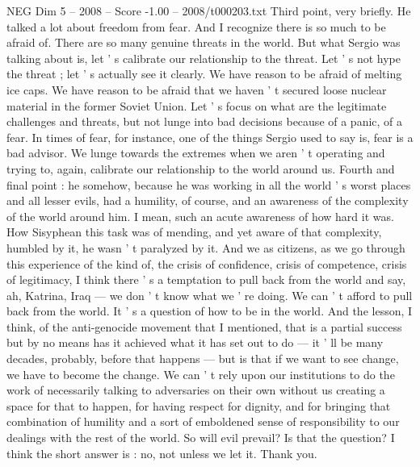 \begin{textsample}{NEG Dim 5 – 2008 – Score -1.00 – 2008/t000203.txt}
Third point, very briefly.
He talked a lot about freedom from fear.
And I recognize there is so much to be afraid of.
There are so many genuine threats in the world.
But what Sergio was talking about is, let ' s calibrate our relationship to the threat.
Let ' s not hype the threat ; let ' s actually see it clearly.
We have reason to be afraid of melting ice caps.
We have reason to be afraid that we haven ' t secured loose nuclear material in the former Soviet Union.
Let ' s focus on what are the legitimate challenges and threats, but not lunge into bad decisions because of a panic, of a fear.
In times of fear, for instance, one of the things Sergio used to say is, fear is a bad advisor.
We lunge towards the extremes when we aren ' t operating and trying to, again, calibrate our relationship to the world around us.
Fourth and final point : he somehow, because he was working in all the world ' s worst places and all lesser evils, had a humility, of course, and an awareness of the complexity of the world around him.
I mean, such an acute awareness of how hard it was.
How Sisyphean this task was of mending, and yet aware of that complexity, humbled by it, he wasn ' t paralyzed by it.
And we as citizens, as we go through this experience of the kind of, the crisis of confidence, crisis of competence, crisis of legitimacy, I think there ' s a temptation to pull back from the world and say, ah, Katrina, Iraq — we don ' t know what we ' re doing.
We can ' t afford to pull back from the world.
It ' s a question of how to be in the world.
And the lesson, I think, of the anti-genocide movement that I mentioned, that is a partial success but by no means has it achieved what it has set out to do — it ' ll be many decades, probably, before that happens — but is that if we want to see change, we have to become the change.
We can ' t rely upon our institutions to do the work of necessarily talking to adversaries on their own without us creating a space for that to happen, for having respect for dignity, and for bringing that combination of humility and a sort of emboldened sense of responsibility to our dealings with the rest of the world.
So will evil prevail?
Is that the question?
I think the short answer is : no, not unless we let it.
Thank you.

\end{textsample}
